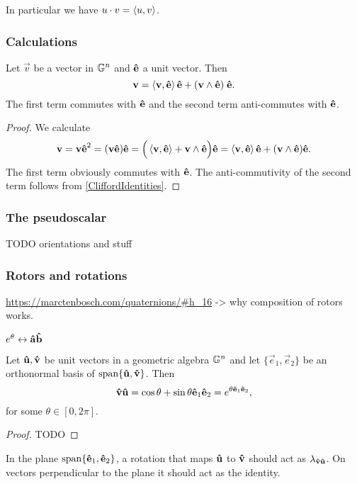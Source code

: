 In particular we have $u\cdot v = \inner{u,v}$.

\subsubsection{Calculations}

\begin{proposition}
Let $\vec{v}$ be a vector in $\G^n$ and $\vhat{e}$ a unit vector. Then
\[ \vec{v} = \inner{\vec{v},\vhat{e}}\vhat{e} + (\vec{v}\wedge \vhat{e})\;\vhat{e}. \]
The first term commutes with $\vhat{e}$ and the second term anti-commutes with $\vhat{e}$.
\end{proposition}
\begin{proof}
We calculate
\[ \vec{v} = \vec{v}\vhat{e}^2 = (\vec{v}\vhat{e})\vhat{e} = \Big(\inner{\vec{v},\vhat{e}} + \vec{v}\wedge \vhat{e}\Big)\vhat{e} = \inner{\vec{v},\vhat{e}}\vhat{e} + (\vec{v}\wedge \vhat{e})\vhat{e}. \]
The first term obviously commutes with $\vhat{e}$. The anti-commutivity of the second term follows from \ref{CliffordIdentities}.
\end{proof}

\subsubsection{The pseudoscalar}
TODO orientations and stuff

\subsubsection{Rotors and rotations}
\url{https://marctenbosch.com/quaternions/#h_16}
-> why composition of rotors works.

\begin{proposition}
$e^{\theta} \leftrightarrow \vhat{a}\vhat{b}$
\end{proposition}

\begin{lemma}
Let $\vhat{u}, \vhat{v}$ be unit vectors in a geometric algebra $\G^n$ and let $\{\vec{e}_1, \vec{e}_2\}$ be an orthonormal basis of $\Span\{\vhat{u},\vhat{v}\}$. Then
\[ \vhat{v}\vhat{u} = \cos\theta + \sin\theta \vhat{e}_1\vhat{e}_2 = e^{\theta \vhat{e}_1\vhat{e}_2}, \]
for some $\theta \in [ 0,2\pi ]$.
\end{lemma}
\begin{proof}
TODO
\end{proof}


In the plane $\Span\{\vhat{e}_1,\vhat{e}_2\}$, a rotation that maps $\vhat{u}$ to $\vhat{v}$ should act as $\lambda_{\vhat{v}\vhat{u}}$. On vectors perpendicular to the plane it should act as the identity.


